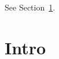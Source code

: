 \documentclass{article}
\begin{document}
See Section~\ref{sec:intro}.
\section{Intro}
\label{sec:intro}
\end{document}

